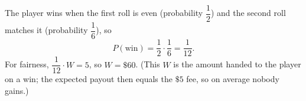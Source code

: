 The player wins when the first roll is even (probability $\dfrac{1}{2}$) and the second roll matches it (probability $\dfrac{1}{6}$), so
\[
P(\text{win})=\dfrac{1}{2}\cdot\dfrac{1}{6}=\dfrac{1}{12}.
\]
For fairness, $\dfrac{1}{12}\cdot W=5$, so $W=\boxed{\$60}$. (This $W$ is the amount handed to the player on a win; the expected payout then equals the $\$5$ fee, so on average nobody gains.)
